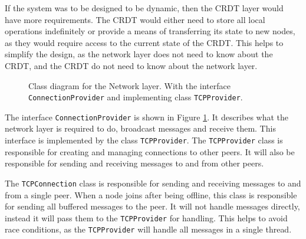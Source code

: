 \documentclass[12pt]{report}
\begin{document}
If the system was to be designed to be dynamic, then the CRDT layer would have more requirements. The CRDT would either need to store all local operations indefinitely or provide a means of transferring its state to new nodes, as they would require access to the current state of the CRDT.
This helps to simplify the design, as the network layer does not need to know about the CRDT, and the CRDT do not need to know about the network layer. \par 

\begin{figure}[h]
    \centering
    \caption{Class diagram for the Network layer. With the interface \texttt{ConnectionProvider} and implementing class \texttt{TCPProvider}.}
    \label{fig:connection}
\end{figure}

The interface \texttt{ConnectionProvider} is shown in Figure \ref{fig:connection}. It describes what the network layer is required to do, broadcast messages and receive them. This interface is implemented by the class \texttt{TCPProvider}. The \texttt{TCPProvider} class is responsible for creating and managing connections to other peers. It will also be responsible for sending and receiving messages to and from other peers. \par


The \texttt{TCPConnection} class is responsible for sending and receiving messages to and from a single peer. When a node joins after being offline, this class is responsible for sending all buffered messages to the peer. It will not handle messages directly, instead it will pass them to the \texttt{TCPProvider} for handling. This helps to avoid race conditions, as the \texttt{TCPProvider} will handle all messages in a single thread. \par
\end{document}
